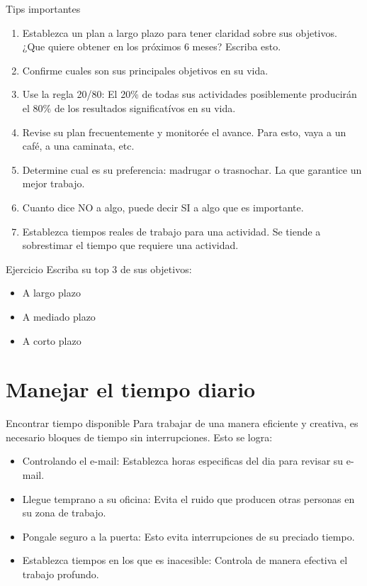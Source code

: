 \documentclass[
10pt,
aspectratio=169,
]{beamer}
\begin{document}
\begin{frame}[c]{Tips importantes}
\begin{enumerate}
\item Establezca un plan a largo plazo para tener claridad sobre sus objetivos. ¿Que quiere obtener en los pr\'oximos 6 meses? Escriba esto.
\item Confirme cuales son sus principales objetivos en su vida.
\item Use la regla 20/80: El 20\% de todas sus actividades posiblemente producir\'an el 80\% de los resultados significat\'ivos en su vida. 
\item Revise su plan frecuentemente y monitor\'ee el avance. Para esto, vaya a un caf\'e, a una caminata, etc.
\item Determine cual es su preferencia: madrugar o trasnochar. La que garantice un mejor trabajo.
\item Cuanto dice NO a algo, puede decir SI a algo que es importante.
\item Establezca tiempos reales de trabajo para una actividad.  Se tiende a sobrestimar el tiempo que requiere una actividad.  
\end{enumerate}
\end{frame}

\begin{frame}[c]{Ejercicio}
Escriba su top 3 de sus objetivos:
\begin{itemize}
\item A largo plazo
\item A mediado plazo
\item A corto plazo
\end{itemize}
\end{frame}


\section{Manejar el tiempo diario}
\begin{frame}[c]{Encontrar tiempo disponible}
Para trabajar de una manera eficiente y creativa, es necesario bloques de tiempo sin interrupciones. Esto se logra:
\begin{itemize}
\item \alert{Controlando el e-mail}: Establezca horas especificas del dia para revisar su e-mail. 
\item \alert{Llegue temprano a su oficina}: Evita el ruido que producen otras personas en su zona de trabajo.
\item \alert{Pongale seguro a la puerta}: Esto evita interrupciones de su preciado tiempo. 
\item \alert{Establezca tiempos en los que es inacesible}: Controla de manera efectiva el trabajo profundo. 
\end{itemize}
\end{frame}
\end{document}
